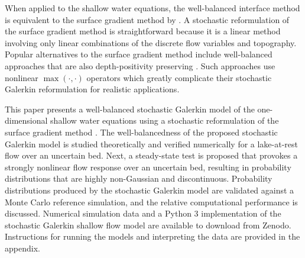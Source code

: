 When applied to the shallow water equations, the well-balanced interface method is equivalent to the surface gradient method by \citet{zhou2001}.
A stochastic reformulation of the surface gradient method is straightforward because it is a linear method involving only linear combinations of the discrete flow variables and topography.
Popular alternatives to the surface gradient method include well-balanced approaches that are also depth-positivity preserving \citep{audusse2004,liang-marche2009}.
Such approaches use nonlinear $\max(\cdot, \cdot)$ operators which greatly complicate their stochastic Galerkin reformulation for realistic applications.

This paper presents a well-balanced stochastic Galerkin model of the one-dimensional shallow water equations using a stochastic reformulation of the surface gradient method \citep{zhou2001}.
The well-balancedness of the proposed stochastic Galerkin model is studied theoretically and verified numerically for a lake-at-rest flow over an uncertain bed.
Next, a steady-state test is proposed that provokes a strongly nonlinear flow response over an uncertain bed, resulting in probability distributions that are highly non-Gaussian and discontinuous.
Probability distributions produced by the stochastic Galerkin model are validated against a Monte Carlo reference simulation, and the relative computational performance is discussed.
Numerical simulation data \citep{shaw-kesserwani2018a} and a Python 3 implementation of the stochastic Galerkin shallow flow model \citep{shaw-kesserwani2018b} are available to download from Zenodo.
Instructions for running the models and interpreting the data are provided in the appendix.

